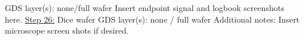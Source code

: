 \vspace{0.5em}
GDS layer(s): none/full wafer
%
%
\noindent Insert endpoint signal and logbook screenshots here.
\newpage
\noindent \underline{Step 26:} Dice wafer
\vspace{0.5em} \newline
GDS layer(s): none / full wafer
%
\vspace{1em}
\noindent Additional notes: Insert microscope screen shots if desired. 

